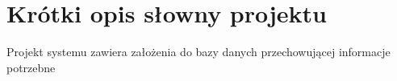 \section{Krótki opis słowny projektu}
Projekt systemu zawiera założenia do bazy danych przechowującej informacje potrzebne

